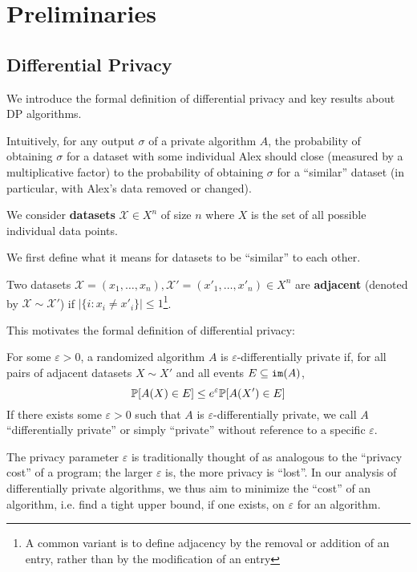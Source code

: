 
\section{Preliminaries}

\subsection{Differential Privacy}

We introduce the formal definition of differential privacy and key results about DP algorithms. 

Intuitively, for any output $\sigma$ of a private algorithm $A$, the probability of obtaining $\sigma$ for a dataset with some individual Alex should close (measured by a multiplicative factor) to the probability of obtaining $\sigma$ for a ``similar'' dataset (in particular, with Alex's data removed or changed).

We consider \textbf{datasets} $\mathcal{X}\in X^n$ of size $n$ where $X$ is the set of all possible individual data points.

We first define what it means for datasets to be ``similar'' to each other. 

\begin{defn}
    Two datasets $\mathcal{X}=(x_1, \ldots, x_n), \mathcal{X}'=(x'_1, \ldots, x'_n)\in X^n$ are \textbf{adjacent} (denoted by $\mathcal{X}\sim\mathcal{X}'$) if $|\{i: x_i\neq x'_i\}|\leq 1$\footnote{A common variant is to define adjacency by the removal or addition of an entry, rather than by the modification of an entry}.
\end{defn}

This motivates the formal definition of differential privacy:

\begin{defn}
    For some $\varepsilon>0$, a randomized algorithm $A$ is $\varepsilon$-differentially private if, for all pairs of adjacent datasets $X\sim X'$ and all events $E \subseteq \texttt{im}(A)$, \[\mathbb{P}[A(X) \in E]\leq e^\varepsilon \mathbb{P}[A(X')\in E]\]
    If there exists some $\varepsilon>0$ such that $A$ is $\varepsilon$-differentially private, we call $A$ ``differentially private'' or simply ``private'' without reference to a specific $\varepsilon$.
\end{defn}

The privacy parameter $\varepsilon$ is traditionally thought of as analogous to the ``privacy cost'' of a program; the larger $\varepsilon$ is, the more privacy is ``lost''. In our analysis of differentially private algorithms, we thus aim to minimize the ``cost'' of an algorithm, i.e. find a tight upper bound, if one exists, on $\varepsilon$ for an algorithm. 

